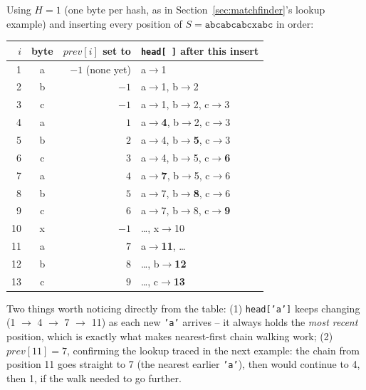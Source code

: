 \documentclass[11pt]{article}
\begin{document}
\begin{tcolorbox}[colback=green!5!white,colframe=green!45!black,title={Worked example: building the chain, byte by byte, over $S$}]
Using $H{=}1$ (one byte per hash, as in Section~\ref{sec:matchfinder}'s lookup example)
and inserting every position of $S = \texttt{abcabcabcxabc}$ in order:
\begin{center}
\begin{tabular}{@{}rcrl@{}}
\toprule
$i$ & byte & $prev[i]$ set to & \texttt{head[\,]} after this insert \\
\midrule
1 & a & $-1$ (none yet) & a$\to$1 \\
2 & b & $-1$ & a$\to$1, b$\to$2 \\
3 & c & $-1$ & a$\to$1, b$\to$2, c$\to$3 \\
4 & a & $1$ & a$\to$\textbf{4}, b$\to$2, c$\to$3 \\
5 & b & $2$ & a$\to$4, b$\to$\textbf{5}, c$\to$3 \\
6 & c & $3$ & a$\to$4, b$\to$5, c$\to$\textbf{6} \\
7 & a & $4$ & a$\to$\textbf{7}, b$\to$5, c$\to$6 \\
8 & b & $5$ & a$\to$7, b$\to$\textbf{8}, c$\to$6 \\
9 & c & $6$ & a$\to$7, b$\to$8, c$\to$\textbf{9} \\
10 & x & $-1$ & \dots, x$\to$10 \\
11 & a & $7$ & a$\to$\textbf{11}, \dots \\
12 & b & $8$ & \dots, b$\to$\textbf{12} \\
13 & c & $9$ & \dots, c$\to$\textbf{13} \\
\bottomrule
\end{tabular}
\end{center}
Two things worth noticing directly from the table: (1) \texttt{head['a']} keeps
changing (1 $\to$ 4 $\to$ 7 $\to$ 11) as each new \texttt{'a'} arrives -- it always
holds the \emph{most recent} position, which is exactly what makes nearest-first chain
walking work; (2) $prev[11] = 7$, confirming the lookup traced in the next example: the
chain from position 11 goes straight to 7 (the nearest earlier \texttt{'a'}), then would
continue to 4, then 1, if the walk needed to go further.
\end{tcolorbox}
\end{document}
